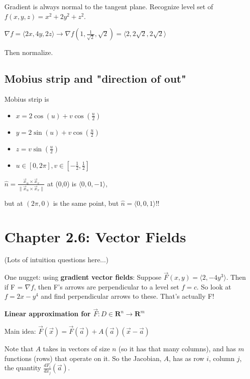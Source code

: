 \documentclass[11pt, oneside]{article}   	%
\begin{document}
Gradient is always normal to the tangent plane.
Recognize level set of $f(x,y,z) = x^2 + 2y^2 + z^2$.  

$\nabla f = \langle 2x, 4y, 2z \rangle \rightarrow \nabla f(1, \frac{1}{\sqrt{2}}, \sqrt{2}) = \langle 2, 2\sqrt{2}, 2\sqrt{2}\rangle$

Then normalize.

\subsection{Mobius strip and "direction of out"}
Mobius strip is 
\begin{itemize}
\item $x = 2\cos(u) + v\cos(\frac{u}{2})$
\item $y = 2\sin(u) + v\cos(\frac{u}{2})$
\item $z = v \sin(\frac{u}{2})$
\item $u \in [0, 2\pi], v \in [-\frac{1}{2}, \frac{1}{2}]$
\end{itemize}

$\hat{n} = \frac
	{\overrightarrow{x}_u \times  \overrightarrow{x}_v}
	{\|\overrightarrow{x}_u \times  \overrightarrow{x}_v\|}
	$ at (0,0) is $\langle 0, 0, -1 \rangle$, 
	
but at $(2\pi, 0)$ is the same point, but $\hat{n} = \langle 0, 0, 1 \rangle$!!
	


\section{Chapter 2.6: Vector Fields}

(Lots of intuition questions here...)

One nugget: using \textbf{gradient vector fields}:
Suppose $\overrightarrow{F}(x,y) = \langle 2, -4y^3 \rangle$.  
Then if F = $\nabla f$, then F's arrows are perpendicular to a level set $f = c$.
So look at $f  =  2x -y^4 $ and find perpendicular arrows to these.  That's actually F!

\textbf{Linear approximation for $\overrightarrow{F}: D \in \mathbf{R}^n \rightarrow \mathbf{R}^m$}

Main idea: 
$\overrightarrow{F}(\overrightarrow{x}) = \overrightarrow{F}(\overrightarrow{a}) + A(\overrightarrow{a})(\overrightarrow{x} - \overrightarrow{a})$

Note that $A$ takes in vectors of size $n$ (so it has that many columns), and has $m$ functions (rows) that operate on it.
So the Jacobian, $A$, has as row $i$, column $j$, the quantity $\frac{dF_i}{dx_j}(\overrightarrow{a})$.
\end{document}

